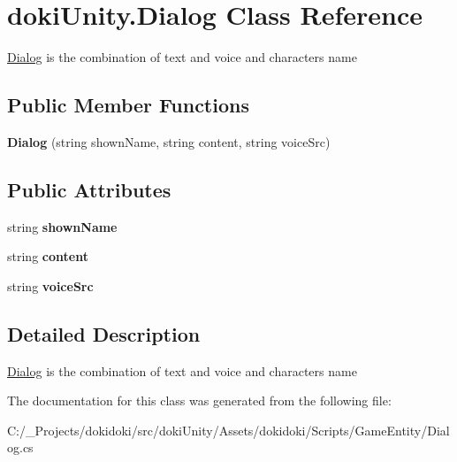 \hypertarget{classdoki_unity_1_1_dialog}{}\section{doki\+Unity.\+Dialog Class Reference}
\label{classdoki_unity_1_1_dialog}


\hyperlink{classdoki_unity_1_1_dialog}{Dialog} is the combination of text and voice and character\textquotesingle{}s name  


\subsection*{Public Member Functions}
\begin{DoxyCompactItemize}
\item 
{\bfseries Dialog} (string shown\+Name, string content, string voice\+Src)\hypertarget{classdoki_unity_1_1_dialog_ab0ce8ee4b0237305d32ccc9d8b567f73}{}\label{classdoki_unity_1_1_dialog_ab0ce8ee4b0237305d32ccc9d8b567f73}

\end{DoxyCompactItemize}
\subsection*{Public Attributes}
\begin{DoxyCompactItemize}
\item 
string {\bfseries shown\+Name}\hypertarget{classdoki_unity_1_1_dialog_a759cee0a438fe77d80afc97dadc05675}{}\label{classdoki_unity_1_1_dialog_a759cee0a438fe77d80afc97dadc05675}

\item 
string {\bfseries content}\hypertarget{classdoki_unity_1_1_dialog_a47676d7e2a0f7365ad8ba06ef8dc52c2}{}\label{classdoki_unity_1_1_dialog_a47676d7e2a0f7365ad8ba06ef8dc52c2}

\item 
string {\bfseries voice\+Src}\hypertarget{classdoki_unity_1_1_dialog_a18c6edb799040330a20bc059a8d9ad04}{}\label{classdoki_unity_1_1_dialog_a18c6edb799040330a20bc059a8d9ad04}

\end{DoxyCompactItemize}


\subsection{Detailed Description}
\hyperlink{classdoki_unity_1_1_dialog}{Dialog} is the combination of text and voice and character\textquotesingle{}s name 



The documentation for this class was generated from the following file\+:\begin{DoxyCompactItemize}
\item 
C\+:/\+\_\+\+Projects/dokidoki/src/doki\+Unity/\+Assets/dokidoki/\+Scripts/\+Game\+Entity/Dialog.\+cs\end{DoxyCompactItemize}
